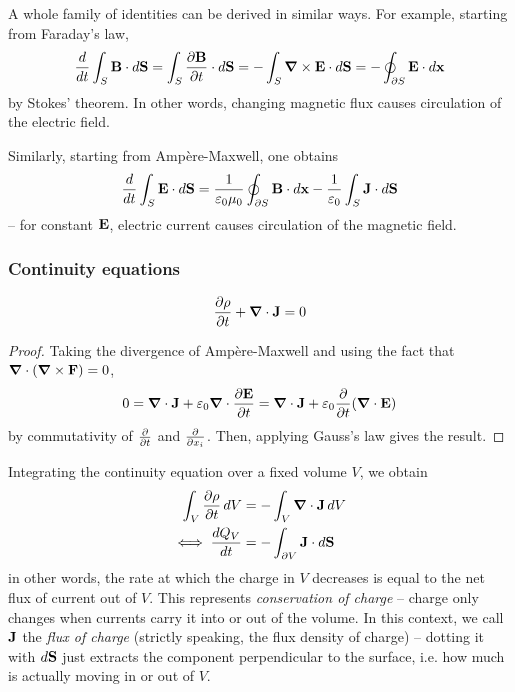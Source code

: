 \documentclass{../../template/note}
\begin{document}
    \begin{remark*}
        A whole family of identities can be derived in similar ways. For example, starting from Faraday's law,
        \begin{align*}
            \frac{d}{dt} \int_S \V B \cdot d\V S = \int_S \pd{\V B}t \cdot d\V S = -\int_S \curl \V E \cdot d\V S = -\oint_{\pr S} \V E \cdot d\V x
        \end{align*}
        by Stokes' theorem. In other words, changing magnetic flux causes circulation of the electric field.

        Similarly, starting from Amp\`ere-Maxwell, one obtains
        \begin{align*}
            \frac{d}{dt} \int_S \V E \cdot d\V S = \frac 1{\eps_0\mu_0} \oint_{\pr S} \V B \cdot d\V x - \frac 1{\eps_0} \int_S \V J \cdot d \V S
        \end{align*}
        -- for constant \(\V E\), electric current causes circulation of the magnetic field.
    \end{remark*}
    
    \subsubsection{Continuity equations}

    \begin{proposition}
        \[
            \pd \rho t + \div \V J = 0
        \]
    \end{proposition}
    
    \begin{proof}
        Taking the divergence of Amp\`ere-Maxwell and using the fact that \(\div (\curl \V F) = 0\),
        \begin{align*}
            0 = \div \V J + \eps_0 \div \pd{\V E}{t} = \div \V J + \eps_0 \pd{}{t}(\div \V E)
        \end{align*}
        by commutativity of \(\pd{}{t}\) and \(\pd{}{x_i}\). Then, applying Gauss's law gives the result.
    \end{proof}
    
    Integrating the continuity equation over a fixed volume \(V\), we obtain
    \begin{align*}
        \int_V \pd \rho t \D V &= -\int_V \div \V J \D V \\
        \iff \frac{dQ_V}{dt} &= -\int_{\pr V} \V J \cdot d\V S
    \end{align*}
    in other words, the rate at which the charge in \(V\) decreases is equal to the net flux of current out of \(V\). This represents \emph{conservation of charge} -- charge only changes when currents carry it into or out of the volume. In this context, we call \(\V J\) the \emph{flux of charge} (strictly speaking, the flux density of charge) -- dotting it with \(d \V S\) just extracts the component perpendicular to the surface, i.e. how much is actually moving in or out of \(V\).
\end{document}
